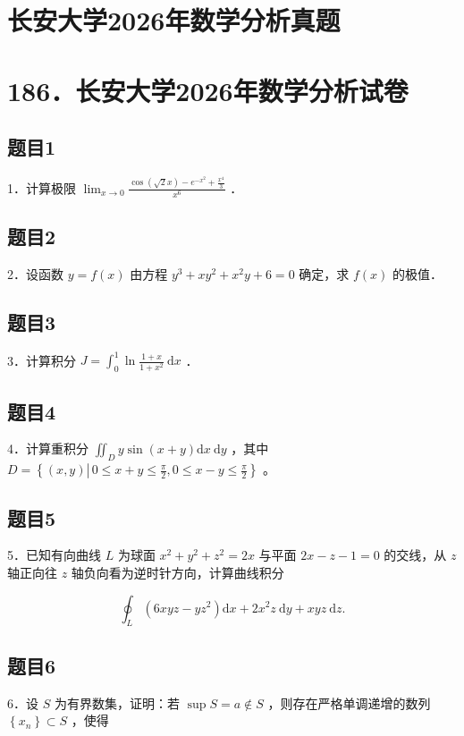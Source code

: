 \documentclass{article}
\begin{document}
\section*{长安大学2026年数学分析真题}
\section*{186．长安大学2026年数学分析试卷}

\subsection{题目1}
1．计算极限 \(\lim _{x \rightarrow 0} \frac{\cos (\sqrt{2} x)-e^{-x^{2}}+\frac{x^{4}}{3}}{x^{6}}\) ．

\subsection{题目2}
2．设函数 \(y=f(x)\) 由方程 \(y^{3}+x y^{2}+x^{2} y+6=0\) 确定，求 \(f(x)\) 的极值．

\subsection{题目3}
3．计算积分 \(J=\int_{0}^{1} \ln \frac{1+x}{1+x^{2}} \mathrm{~d} x\) ．

\subsection{题目4}
4．计算重积分 \(\iint_{D} y \sin (x+y) \mathrm{d} x \mathrm{~d} y\) ，其中 \(D=\left\{(x, y) \left\lvert\, 0 \leq x+y \leq \frac{\pi}{2}\right., 0 \leq x-y \leq \frac{\pi}{2}\right\}\) 。

\subsection{题目5}
5．已知有向曲线 \(L\) 为球面 \(x^{2}+y^{2}+z^{2}=2 x\) 与平面 \(2 x-z-1=0\) 的交线，从 \(z\) 轴正向往 \(z\) 轴负向看为逆时针方向，计算曲线积分

\[
\oint_{L}\left(6 x y z-y z^{2}\right) \mathrm{d} x+2 x^{2} z \mathrm{~d} y+x y z \mathrm{~d} z .
\]

\subsection{题目6}
6．设 \(S\) 为有界数集，证明：若 \(\sup S=a \notin S\) ，则存在严格单调递增的数列 \(\left\{x_{n}\right\} \subset S\) ，使得
\end{document}
